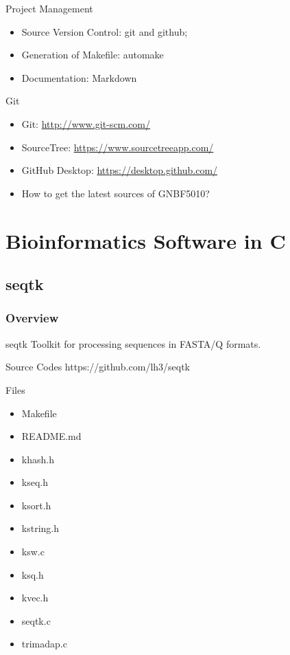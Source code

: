 \documentclass[UTF8]{beamer}
\begin{document}
\begin{frame}[t]{Project Management}
  \begin{itemize}
    \item Source Version Control: git and github;
    \item Generation of Makefile: automake
    \item Documentation: Markdown
  \end{itemize}
\end{frame}

\begin{frame}[t]{Git}
    \begin{itemize}
        \item Git: \url{http://www.git-scm.com/}
        \item SourceTree: \url{https://www.sourcetreeapp.com/}
        \item GitHub Desktop: \url{https://desktop.github.com/}
        \item How to get the latest sources of GNBF5010?
    \end{itemize}
\end{frame}

\section{Bioinformatics Software in C}
\subsection{seqtk}
\begin{frame}
  \frametitle{Overview}
  \begin{block}{seqtk}
    Toolkit for processing sequences in FASTA/Q formats.
  \end{block}
  \begin{block}{Source Codes}
    https://github.com/lh3/seqtk
  \end{block}
\end{frame}

\begin{frame}[t]{Files}
\begin{itemize}
  \item Makefile
  \item README.md
  \item khash.h
  \item kseq.h
  \item ksort.h
  \item kstring.h
  \item ksw.c
  \item ksq.h
  \item kvec.h
  \item seqtk.c
  \item trimadap.c
\end{itemize}
\end{frame}
\end{document}

